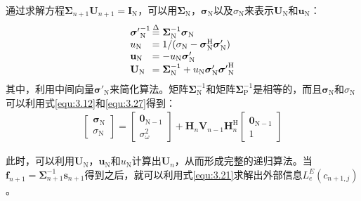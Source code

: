 通过求解方程$\boldsymbol{\Sigma}_{n+1}\mathbf{U}_{n+1}=\mathbf{I}_{\mathrm{N}}$，可以用$\boldsymbol{\Sigma}_{\mathrm{N}}$，$\boldsymbol{\sigma}_{\mathrm{N}}$以及$\sigma_{\mathrm{N}}$来表示$\mathbf{U}_{\mathrm{N}}$和$\mathbf{u}_{\mathrm{N}}$：
\begin{eqnarray}
    \begin{array}{l@{\,}l}
        {{\boldsymbol{\sigma}}'}_{\mathrm{N}}^{-1}&\overset{\Delta}{=}\boldsymbol{\Sigma}_{\mathrm{N}}^{-1}\boldsymbol{\sigma}_{\mathrm{N}}\\
        u_{\mathrm{N}}&=1/(\sigma_{\mathrm{N}}-\boldsymbol{\sigma}_{\mathrm{N}}^{\mathrm{H}}{\boldsymbol{\sigma}}'_{\mathrm{N}})\\
        \mathbf{u}_{\mathrm{N}}&=-u_{\mathrm{N}}{\boldsymbol{\sigma}}'_{\mathrm{N}}\\
        \mathbf{U}_{\mathrm{N}}&=\boldsymbol{\Sigma}_{\mathrm{N}}^{-1}+u_{\mathrm{N}}{\boldsymbol{\sigma}}'_{\mathrm{N}}{{\boldsymbol{\sigma}}'}_{\mathrm{N}}^{\mathrm{H}}
    \end{array}
    \label{equ:3.28}
\end{eqnarray}
其中，利用中间向量${\boldsymbol{\sigma}}'_{\mathrm{N}}$来简化算法。矩阵$\boldsymbol{\Sigma}_{\mathrm{N}}^{-1}$和矩阵$\boldsymbol{\Sigma}_{\mathrm{P}}^{-1}$是相等的，而且$\boldsymbol{\sigma}_{\mathrm{N}}$和$\sigma_{\mathrm{N}}$可以利用式\ref{equ:3.12}和\ref{equ:3.27}得到：
\begin{eqnarray}
    \begin{bmatrix}
        \boldsymbol{\sigma}_{\mathrm{N}}\\
        \sigma_{\mathrm{N}}
    \end{bmatrix}
    =
    \begin{bmatrix}
        \mathbf{0}_{\mathrm{N}-1}\\
        \sigma_{\omega}^2
    \end{bmatrix}
    +\mathbf{H}_n\mathbf{V}_{n-1}\mathbf{H}_n^{\mathrm{H}}
    \begin{bmatrix}
        \mathbf{0}_{\mathrm{N}-1}\\
        1
    \end{bmatrix}
    \label{equ:3.29}
\end{eqnarray}

此时，可以利用$\mathbf{U}_{\mathrm{N}}$，$\mathbf{u}_{\mathrm{N}}$和$u_{\mathrm{N}}$计算出$\mathbf{U}_n$，从而形成完整的递归算法。当$\mathbf{f}_{n+1}=\boldsymbol{\Sigma}_{n+1}^{-1}\mathbf{s}_{n+1}$得到之后，就可以利用式\ref{equ:3.21}求解出外部信息$L_e^E(c_{n+1,j})$。

